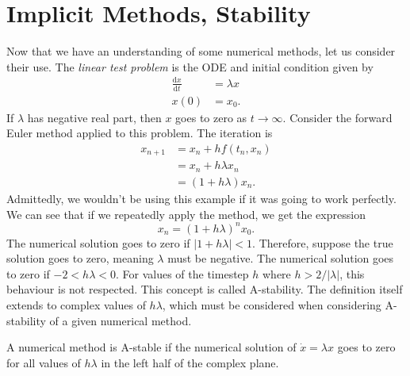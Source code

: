 \section{Implicit Methods, Stability}


Now that we have an understanding of some numerical methods, let us consider their use.
The \textit{linear test problem} is the ODE and initial condition given by
\begin{equation*}
    \begin{aligned}
        \frac{\mathrm{d}x}{\mathrm{d}t} &= \lambda x \\
        x(0) &= x_0.
    \end{aligned}
\end{equation*}
If $\lambda$ has negative real part, then $x$ goes to zero as $t \rightarrow \infty$.
Consider the forward Euler method applied to this problem. The iteration is
\begin{align*}
    x_{n+1} &= x_n + h f(t_n, x_n) \\
    &= x_n + h \lambda  x_n \\
    &= (1 + h \lambda) x_n.
\end{align*}
Admittedly, we wouldn't be using this example if it was going to work perfectly.
We can see that if we repeatedly apply the method, we get the expression
\begin{equation*}
    x_n = (1 + h \lambda)^n x_0.
\end{equation*}
The numerical solution goes to zero if $|1 + h \lambda| < 1$. 
Therefore, suppose the true solution goes to zero, meaning $\lambda$ must be negative.
The numerical solution goes to zero if $-2 < h \lambda < 0$.
For values of the timestep $h$ where $h > 2/|\lambda|$, this behaviour is not respected.
This concept is called A-stability.
The definition itself extends to complex values of $h \lambda$, which must be considered when considering A-stability of a given numerical method.

\begin{definition}
    A numerical method is A-stable if the numerical solution of $\dot{x} = \lambda x$ goes to zero for all values of $h \lambda $ in the left half of the complex plane.    
\end{definition}

